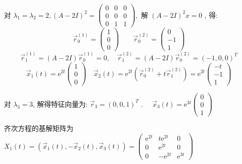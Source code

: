 对  $\lambda_{1}=\lambda_{2}=2,(A-2 I)^{2}=\left(\begin{array}{lll}0 & 0 & 0 \\ 0 & 0 & 0 \\ 0 & 1 & 1\end{array}\right) ,$ 解 $ (A-2 I)^{2} x=0$ , 得:  $$\vec{r}_{0}^{(1)}=\left(\begin{array}{l}1 \\ 0 \\ 0\end{array}\right)\qquad \vec{r}_{0}^{(2)}=\left(\begin{array}{l}0 \\ -1 \\ 1\end{array}\right)$$   
$$\vec{r}_{1}^{(1)}=(A-2 I) \vec{r}_{0}^{(1)}=0, \quad \vec{r}_{1}^{(2)}=(A-2 I) \vec{r}_{0}^{(2)}=(-1,0,0)^{T}$$   $$\vec{x}_{1}(t)=\mathrm{e}^{2 t}\left(\begin{array}{l}1 \\ 0 \\ 0\end{array}\right) \quad \vec{x}_{2}(t)=\mathrm{e}^{2 t}\left(\vec{r}_{0}^{(2)}+t \vec{r}_{1}^{(2)}\right)=\mathrm{e}^{2 t}\left(\begin{array}{c}-t \\ -1 \\ 1\end{array}\right)$$  

对  $\lambda_{3}=3 $, 解得特征向量为:  $\vec{r}_{3}=(0,0,1)^{T}$ . $\quad \vec{x}_{3}(t)=\mathrm{e}^{3 t}\left(\begin{array}{l}0 \\ 0 \\ 1\end{array}\right) $




齐次方程的基解矩阵为  $X_{1}(t)=\left(\vec{x}_{1}(t),-\vec{x}_{2}(t), \vec{x}_{3}(t)\right)=\left(\begin{array}{ccc}\mathrm{e}^{2 t} & t \mathrm{e}^{2 t} & 0 \\ 0 & \mathrm{e}^{2 t} & 0 \\ 0 & -\mathrm{e}^{2 t} & \mathrm{e}^{3 t}\end{array}\right)$ 

